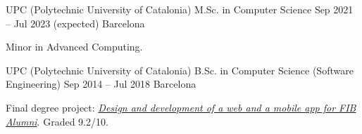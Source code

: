 

\begin{cventries}

  \cventry
    {UPC (Polytechnic University of Catalonia)} %
    {M.Sc. in Computer Science} %
    {Sep 2021 – Jul 2023 (expected)} %
    {Barcelona} %
    {
      \begin{cvitems} %
        \item {Minor in Advanced Computing.}
      \end{cvitems}
    }
  \cventry
    {UPC (Polytechnic University of Catalonia)} %
    {B.Sc. in Computer Science (Software Engineering)} %
    {Sep 2014 – Jul 2018} %
    {Barcelona} %
    {
      \begin{cvitems} %
        \item {Final degree project: \textit{\href{https://upcommons.upc.edu/handle/2117/121975}{Design and development of a web and a mobile app for FIB Alumni}}. Graded 9.2/10.}
      \end{cvitems}
    }


\end{cventries}
